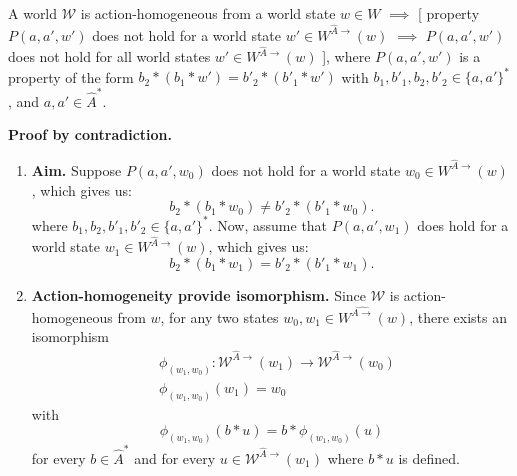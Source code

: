 \begin{propositionE}
    A world $\mathscr{W}$ is action-homogeneous from a world state $w \in W$ $\implies$ [ property $P(a, a', w')$ does not hold for a world state $w' \in W^{\hat{A}\to}(w)$ $\implies$ $P(a, a', w')$ does not hold for all world states $w' \in W^{\hat{A}\to}(w)$ ], where $P(a, a', w')$ is a property of the form $b_{2} \ast (b_{1} \ast w') = b'_{2} \ast (b'_{1} \ast w')$ with $b_{1}, b'_{1}, b_{2}, b'_{2} \in \{a, a'\}^{*}$, and $a, a' \in \hat{A}^{*}$.
\end{propositionE}
\begin{proofE}
\textbf{Proof by contradiction.}
\begin{enumerate}
    \item \textbf{Aim.}
    Suppose $P(a, a', w_{0})$ does not hold for a world state $w_{0} \in W^{\hat{A}\to}(w)$, which gives us:
    \begin{equation}
        b_{2} \ast (b_{1} \ast w_{0}) \neq b'_{2} \ast (b'_{1} \ast w_{0}).
    \end{equation}
    where $b_{1}, b_{2}, b'_{1}, b'_{2} \in \{a, a'\}^{*}$.
    Now, assume that $P(a, a', w_{1})$ does hold for a world state $w_{1} \in W^{\hat{A}\to}(w)$, which gives us:
    \begin{equation}
        b_{2} \ast (b_{1} \ast w_{1}) = b'_{2} \ast (b'_{1} \ast w_{1}).
    \end{equation}
    
    \item \textbf{Action-homogeneity provide isomorphism.}
    Since $\mathscr{W}$ is action-homogeneous from $w$, for any two states $w_{0}, w_{1} \in W^{\hat{A\to}}(w)$, there exists an isomorphism
    \begin{align}
        & \phi_{(w_{1}, w_{0})}: \mathscr{W}^{\hat{A}\to}(w_{1}) \to \mathscr{W}^{\hat{A}\to}(w_{0}) \\
        & \phi_{(w_{1}, w_{0})}(w_{1}) = w_{0}
    \end{align}
    with
    \begin{equation}
        \phi_{(w_{1}, w_{0})}(b \ast u) = b \ast \phi_{(w_{1}, w_{0})}(u)
    \end{equation}
    for every $b \in \hat{A}^{*}$ and for every $u \in \mathscr{W}^{\hat{A}\to}(w_{1})$ where $b \ast u$ is defined.


\end{enumerate}
\end{proofE}
